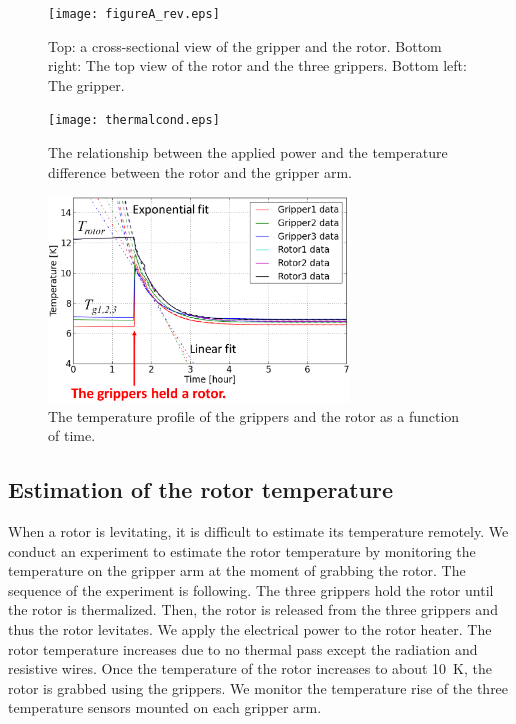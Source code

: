 \documentclass[journal]{IEEEtran}
\begin{document}
\begin{figure}[htb]
   \centering
   \texttt{[image: figureA\_rev.eps]} %
   \caption{Top: a cross-sectional view of the gripper and the rotor. Bottom right: The top view of the rotor and the three grippers. Bottom left: The gripper.}
   \label{fig:figureA}
\end{figure}

\begin{figure}[htb]
   \centering
   \texttt{[image: thermalcond.eps]} %
   \caption{The relationship between the applied power and the temperature difference between the rotor and the gripper arm. }
   \label{fig:thermalcond}
\end{figure}

\begin{figure}[htb]
   \centering
   \includegraphics[width=80mm]{TemperatureEstimate_rev.eps} %
   \caption{The temperature profile of the grippers and the rotor as a function of time. }
   \label{fig:TemperatureEstimate}
\end{figure}

\subsection{Estimation of the rotor temperature}
When a rotor is levitating, it is difficult to estimate its temperature remotely.
We conduct an experiment to estimate the rotor temperature by monitoring the temperature on the gripper arm at the moment of grabbing the rotor.
The sequence of the experiment is following.
The three grippers hold the rotor until the rotor is thermalized.
Then, the rotor is released from the three grippers and thus the rotor levitates.
We apply the electrical power to the rotor heater.
The rotor temperature increases due to no thermal pass except the radiation and resistive wires.
Once the temperature of the rotor increases to about 10~K, the rotor is grabbed using the grippers.
We monitor the temperature rise of the three temperature sensors mounted on each gripper arm.
\end{document}
